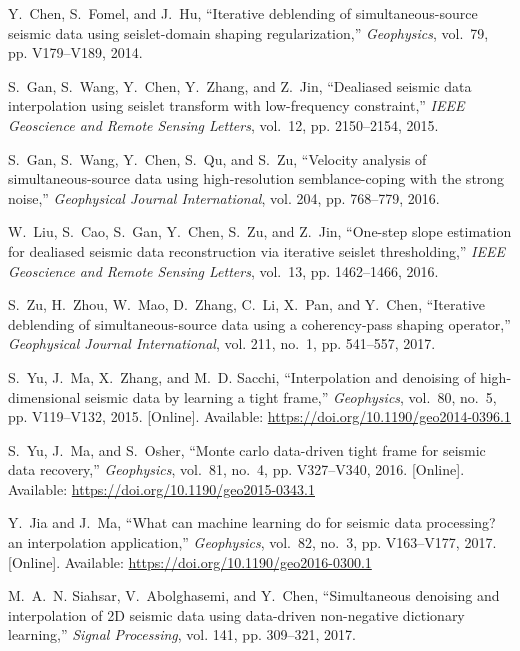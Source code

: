 \begin{thebibliography}{00}
Y.~Chen, S.~Fomel, and J.~Hu, ``Iterative deblending of simultaneous-source
  seismic data using seislet-domain shaping regularization,''
  \emph{Geophysics}, vol.~79, pp. V179--V189, 2014.

S.~Gan, S.~Wang, Y.~Chen, Y.~Zhang, and Z.~Jin, ``Dealiased seismic data
  interpolation using seislet transform with low-frequency constraint,''
  \emph{IEEE Geoscience and Remote Sensing Letters}, vol.~12, pp. 2150--2154,
  2015.

S.~Gan, S.~Wang, Y.~Chen, S.~Qu, and S.~Zu, ``Velocity analysis of
  simultaneous-source data using high-resolution semblance-coping with the
  strong noise,'' \emph{Geophysical Journal International}, vol. 204, pp.
  768--779, 2016.

W.~Liu, S.~Cao, S.~Gan, Y.~Chen, S.~Zu, and Z.~Jin, ``One-step slope estimation
  for dealiased seismic data reconstruction via iterative seislet
  thresholding,'' \emph{IEEE Geoscience and Remote Sensing Letters}, vol.~13,
  pp. 1462--1466, 2016.

S.~Zu, H.~Zhou, W.~Mao, D.~Zhang, C.~Li, X.~Pan, and Y.~Chen, ``Iterative
  deblending of simultaneous-source data using a coherency-pass shaping
  operator,'' \emph{Geophysical Journal International}, vol. 211, no.~1, pp.
  541--557, 2017.

S.~Yu, J.~Ma, X.~Zhang, and M.~D. Sacchi, ``Interpolation and denoising of
  high-dimensional seismic data by learning a tight frame,'' \emph{Geophysics},
  vol.~80, no.~5, pp. V119--V132, 2015. [Online]. Available:
  \url{https://doi.org/10.1190/geo2014-0396.1}


S.~Yu, J.~Ma, and S.~Osher, ``Monte carlo data-driven tight frame for seismic
  data recovery,'' \emph{Geophysics}, vol.~81, no.~4, pp. V327--V340, 2016.
  [Online]. Available: \url{https://doi.org/10.1190/geo2015-0343.1}


Y.~Jia and J.~Ma, ``What can machine learning do for seismic data processing?
  an interpolation application,'' \emph{Geophysics}, vol.~82, no.~3, pp.
  V163--V177, 2017. [Online]. Available:
  \url{https://doi.org/10.1190/geo2016-0300.1}


M.~A.~N. Siahsar, V.~Abolghasemi, and Y.~Chen, ``Simultaneous denoising and
  interpolation of 2{D} seismic data using data-driven non-negative dictionary
  learning,'' \emph{Signal Processing}, vol. 141, pp. 309--321, 2017.


\end{thebibliography}
